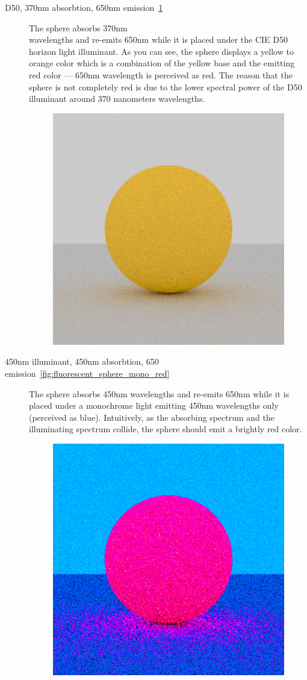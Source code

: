 \begin{description}
	\item[D50, 370nm absorbtion, 650nm emission~\ref{fig:fluorescence_d50_red}] The sphere absorbs 370nm \\wavelengths and re-emits 650nm while it is placed under the CIE D50 horizon light illuminant. As you can see, the sphere displays a yellow to orange color which is a combination of the yellow base and the emitting red color --- 650nm wavelength is perceived as red. The reason that the sphere is not completely red is due to the lower spectral power of the D50 illuminant around 370 nanometers wavelengths.
	\begin{figure}[H]
		\centering
		\includegraphics[width=.6\linewidth]{img/fluorescent_sphere_D50_red.png}
		\caption{}
		\label{fig:fluorescence_d50_red}
	\end{figure}
	\item[450nm illuminant, 450nm absorbtion, 650 emission~\ref{fig:fluorescent_sphere_mono_red}] The sphere absorbs 450nm wavelengths and re-emits 650nm while it is placed under a monochrome light emitting 450nm wavelengths only (perceived as blue). Intuitively, as the absorbing spectrum and the illuminating spectrum collide, the sphere should emit a brightly red color.
	\begin{figure}[H]
		\centering
		\includegraphics[width=.6\linewidth]{img/fluorescent_sphere_mono_red.png}

\end{figure}
\end{description}
